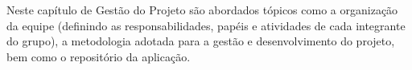Neste capítulo de Gestão do Projeto são abordados tópicos como a organização da equipe (definindo as responsabilidades, papéis e atividades de cada integrante do grupo), a metodologia adotada para a gestão e desenvolvimento do projeto, bem como o repositório da aplicação.




